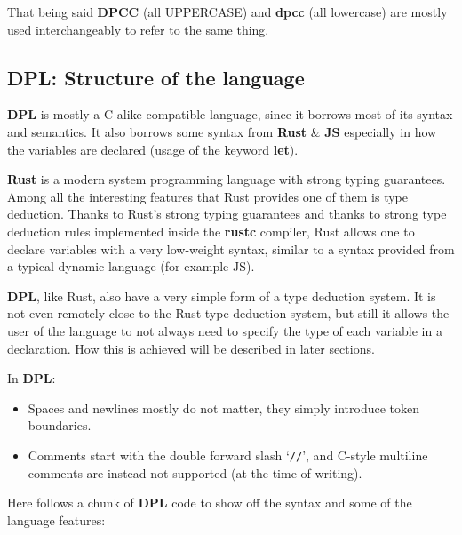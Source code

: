 \documentclass[a4paper]{article}
\begin{document}
That being said \textbf{DPCC} (all UPPERCASE) and \textbf{dpcc} (all lowercase) are mostly used interchangeably to refer to the same thing.


\subsection{DPL: Structure of the language}

\textbf{DPL} is mostly a C-alike compatible language, since it borrows most of its syntax and semantics.
It also borrows some syntax from \textbf{Rust} \&
\textbf{JS} especially in how the variables are declared (usage of the keyword \textbf{let}).

\textbf{Rust} is a modern system programming language with strong typing guarantees.
Among all the interesting features that Rust provides one of them is type deduction.
Thanks to Rust's strong typing guarantees and thanks to strong type deduction rules implemented
inside the \textbf{rustc} compiler, Rust
allows one to declare variables with a very low-weight syntax, similar
to a syntax provided from a typical dynamic language (for example JS).

\textbf{DPL}, like Rust, also have a very simple form of a type deduction system.
It is not even remotely close to the Rust type deduction system, but still it
allows the user of the language to not always need to specify the type of each variable in a declaration.
How this is achieved will be described in later sections.

In \textbf{DPL}:

\begin{itemize}
\item Spaces and newlines mostly do not matter, they simply introduce token boundaries.
\item Comments start with the double forward slash `\texttt{//}', and C-style multiline comments are
instead not supported (at the time of writing).
\end{itemize}



Here follows a chunk of \textbf{DPL} code to show off the syntax and some of the language features:
\end{document}
